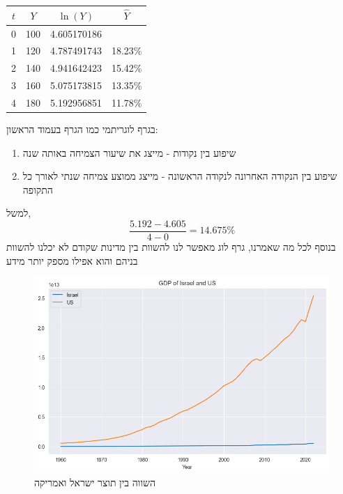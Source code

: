 \documentclass[a4paper,12pt]{article}
\begin{document}
\begin{RTL}
\begin{hebrew}
\begin{table}[h!]
\centering

\begin{tabular}{|c|c|c|c|} \hline 
$t$ & $Y$ & $\ln(Y)$ & $\hat{Y}$ \\ \hline 
0 & 100 & 4.605170186 &  \\ \hline 
1 & 120 & 4.787491743 & 18.23\% \\ \hline 
2 & 140 & 4.941642423 & 15.42\% \\ \hline 
3 & 160 & 5.075173815 & 13.35\% \\ \hline 
4 & 180 & 5.192956851 & 11.78\% \\ \hline

\end{tabular}

\end{table}
בגרף לוגריתמי כמו הגרף בעמוד הראשון:
\begin{enumerate}
    \item שיפוע בין נקודות - מייצג את שיעור הצמיחה באותה שנה
    \item שיפוע בין הנקודה האחרונה לנקודה הראשונה - מייצג ממוצע צמיחה שנתי לאורך כל התקופה
\end{enumerate}
למשל,
$$\frac{5.192 - 4.605}{4 - 0} = 14.675\%$$
בנוסף לכל מה שאמרנו, גרף לוג מאפשר לנו להשוות בין מדינות שקודם לא יכלנו להשוות בניהם והוא אפילו מספק יותר מידע
\begin{figure}[H]
    \centering
    \includegraphics[width=\linewidth]{GPD - US - Israel.png}
    \caption{השווה בין תוצר ישראל ואמריקה}
\end{figure}


\end{hebrew}
\end{RTL}
\end{document}
